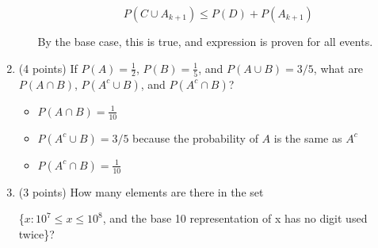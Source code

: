 \documentclass[11pt]{article}
\begin{document}
\begin{enumerate}
\begin{itemize}
\begin{equation*}
P(C \cup A_{k+1}) \le P(D) + P(A_{k+1})
\end{equation*}

By the base case, this is true, and expression is proven for all events.

\end{itemize}



\item (4 points) If $P(A) = \frac{1}{2}$, $P(B) = \frac{1}{5}$, and $P(A\cup B) = 3/5$, what are $P(A\cap B)$, $P(A^c \cup B)$, and $P(A^c \cap B)$?

\begin{itemize}

\item $P(A\cap B) = \frac{1}{10}$
\item $P(A^c \cup B) = 3/5$ because the probability of $A$ is the same as $A^c$ 
\item $P(A^c \cap B) = \frac{1}{10}$

\end{itemize}


\item (3 points) How many elements are there in the set

\{$x : 10^7 \le x \le 10^8$, and the base 10 representation of x has no digit used twice\}?


\end{enumerate}
\end{document}
